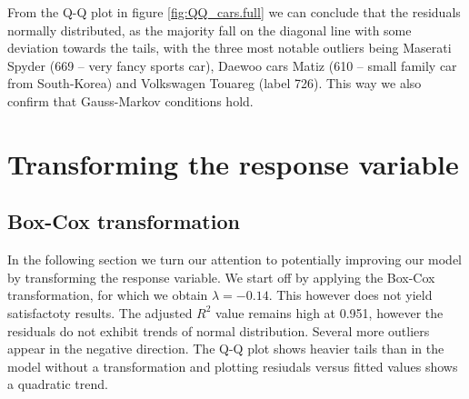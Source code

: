 \documentclass[12pt]{article}
\begin{document}
From the Q-Q plot in figure \ref{fig:QQ_cars.full} we can conclude that the residuals normally distributed, as the majority fall on the 
diagonal line with some deviation towards the tails, with the three most notable outliers being Maserati Spyder (669 -- very fancy sports car),
Daewoo cars Matiz (610 -- small family car from South-Korea) and Volkswagen Touareg (label 726).
This way we also confirm that Gauss-Markov conditions hold.

\section{Transforming the response variable}
\subsection{Box-Cox transformation}
In the following section we turn our attention to potentially improving our model by transforming the response variable. We start off
by applying the Box-Cox transformation, for which we obtain $\lambda = -0.14.$ This however does not yield satisfactoty results. The
adjusted $R^2$ value remains high at 0.951, however the residuals do not exhibit trends of normal distribution. Several more outliers 
appear in the negative direction. The Q-Q plot shows heavier tails than in the model without a transformation and plotting
resiudals versus fitted values shows a quadratic trend.
\end{document}
